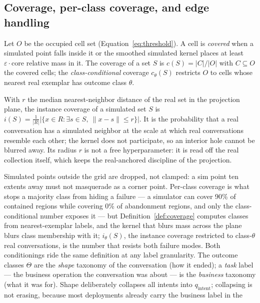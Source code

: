 \subsection{Coverage, per-class coverage, and edge handling}
\begin{definition}
\label{def:coverage}
Let $O$ be the occupied cell set (Equation~\eqref{eq:threshold}).
A cell is \emph{covered} when a simulated point falls inside it or the smoothed simulated
kernel places at least $\varepsilon \cdot \mathrm{core}$ relative mass in it.
The coverage of a set $S$ is $c(S) = |C|/|O|$ with $C \subseteq O$ the covered cells;
the \emph{class-conditional} coverage $c_\theta(S)$ restricts $O$ to cells whose nearest real
exemplar has outcome class $\theta$.
\end{definition}
\begin{definition}
\label{def:instance}
With $r$ the median nearest-neighbor distance of the real set in the projection plane, the
instance coverage of a simulated set $S$ is
$i(S) = \frac{1}{|R|} |\{x \in R : \exists s \in S,\ \lVert x - s\rVert \le r\}|$.
It is the probability that a real conversation has a simulated neighbor at the scale at
which real conversations resemble each other; the kernel does not participate, so an
interior hole cannot be blurred away.
Its radius $r$ is not a free hyperparameter: it is read off the real collection itself,
which keeps the real-anchored discipline of the projection.
\end{definition}
Simulated points outside the grid are dropped, not clamped: a sim point ten extents away must
not masquerade as a corner point.
Per-class coverage is what stops a majority class from hiding a failure --- a simulator can
cover 90\% of contained regions while covering 0\% of abandonment regions, and only the
class-conditional number exposes it --- but Definition~\ref{def:coverage} computes classes
from nearest-exemplar labels, and the kernel that blurs mass across the plane blurs class
membership with it; $i_\theta(S)$, the instance coverage restricted to class-$\theta$ real
conversations, is the number that resists both failure modes.
Both conditionings ride the same definition at any label granularity. The outcome classes
$\Theta$ are the \emph{shape} taxonomy of the conversation (how it ended); a \emph{task} label
--- the business operation the conversation was about --- is the \emph{business} taxonomy
(what it was for). Shape deliberately collapses all intents into $q_{\mathrm{intent}}$;
collapsing is not erasing, because most deployments already carry the business label in the
